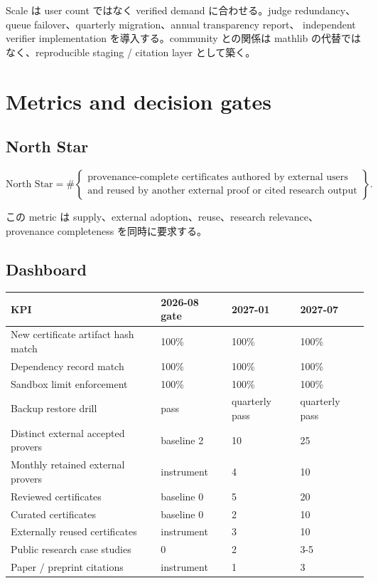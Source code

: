 \documentclass[a4paper,11pt]{ltjsarticle}
\begin{document}
Scale は user count ではなく verified demand に合わせる。judge redundancy、queue failover、quarterly migration、annual transparency report、
independent verifier implementation を導入する。community との関係は mathlib の代替ではなく、reproducible staging / citation layer として築く。

\section{Metrics and decision gates}

\subsection{North Star}

\begin{equation}
\text{North Star}=
\#\left\{
\begin{array}{l}
\text{provenance-complete certificates authored by external users}\\
\text{and reused by another external proof or cited research output}
\end{array}
\right\}.
\end{equation}

この metric は supply、external adoption、reuse、research relevance、provenance completeness を同時に要求する。

\subsection{Dashboard}

\begin{tabularx}{\linewidth}{L{56mm}L{26mm}L{27mm}Y}
\toprule
\textbf{KPI} & \textbf{2026-08 gate} & \textbf{2027-01} & \textbf{2027-07} \\
\midrule
New certificate artifact hash match & 100\% & 100\% & 100\% \\
Dependency record match & 100\% & 100\% & 100\% \\
Sandbox limit enforcement & 100\% & 100\% & 100\% \\
Backup restore drill & pass & quarterly pass & quarterly pass \\
Distinct external accepted provers & baseline 2 & 10 & 25 \\
Monthly retained external provers & instrument & 4 & 10 \\
Reviewed certificates & baseline 0 & 5 & 20 \\
Curated certificates & baseline 0 & 2 & 10 \\
Externally reused certificates & instrument & 3 & 10 \\
Public research case studies & 0 & 2 & 3-5 \\
Paper / preprint citations & instrument & 1 & 3 \\
\bottomrule
\end{tabularx}
\end{document}
